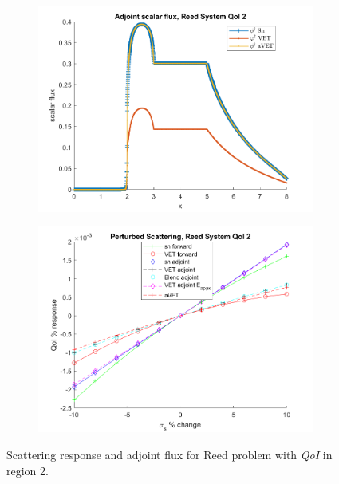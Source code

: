 \documentclass[12pt]{report}
\newcommand{\qoi}{{\it QoI}\xspace}
\begin{document}
%
\begin{figure}[H]
\centering
\begin{subfigure}{.5\textwidth}
  \centering
  \includegraphics[width=.98\linewidth]{figures2/771phia.png}
\end{subfigure}%
\begin{subfigure}{.5\textwidth}
  \centering
  \includegraphics[width=.98\linewidth]{figures2/771sigsSens.png}
\end{subfigure}
\caption{Scattering response and adjoint flux for Reed problem with \qoi in region 2.}
\label{Reed2}
\end{figure}
%
\end{document}
